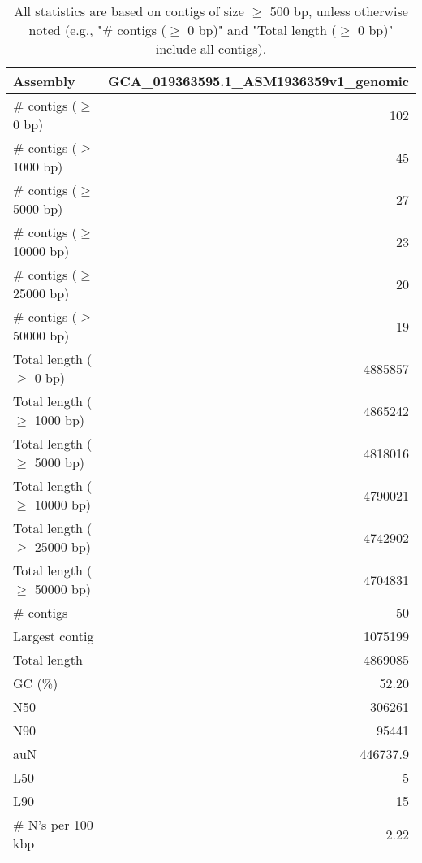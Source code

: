 \documentclass[12pt,a4paper]{article}
\begin{document}
\begin{table}[ht]
\begin{center}
\caption{All statistics are based on contigs of size $\geq$ 500 bp, unless otherwise noted (e.g., "\# contigs ($\geq$ 0 bp)" and "Total length ($\geq$ 0 bp)" include all contigs).}
\begin{tabular}{|l*{1}{|r}|}
\hline
Assembly & GCA\_019363595.1\_ASM1936359v1\_genomic \\ \hline
\# contigs ($\geq$ 0 bp) & 102 \\ \hline
\# contigs ($\geq$ 1000 bp) & 45 \\ \hline
\# contigs ($\geq$ 5000 bp) & 27 \\ \hline
\# contigs ($\geq$ 10000 bp) & 23 \\ \hline
\# contigs ($\geq$ 25000 bp) & 20 \\ \hline
\# contigs ($\geq$ 50000 bp) & 19 \\ \hline
Total length ($\geq$ 0 bp) & 4885857 \\ \hline
Total length ($\geq$ 1000 bp) & 4865242 \\ \hline
Total length ($\geq$ 5000 bp) & 4818016 \\ \hline
Total length ($\geq$ 10000 bp) & 4790021 \\ \hline
Total length ($\geq$ 25000 bp) & 4742902 \\ \hline
Total length ($\geq$ 50000 bp) & 4704831 \\ \hline
\# contigs & 50 \\ \hline
Largest contig & 1075199 \\ \hline
Total length & 4869085 \\ \hline
GC (\%) & 52.20 \\ \hline
N50 & 306261 \\ \hline
N90 & 95441 \\ \hline
auN & 446737.9 \\ \hline
L50 & 5 \\ \hline
L90 & 15 \\ \hline
\# N's per 100 kbp & 2.22 \\ \hline
\end{tabular}
\end{center}
\end{table}
\end{document}
